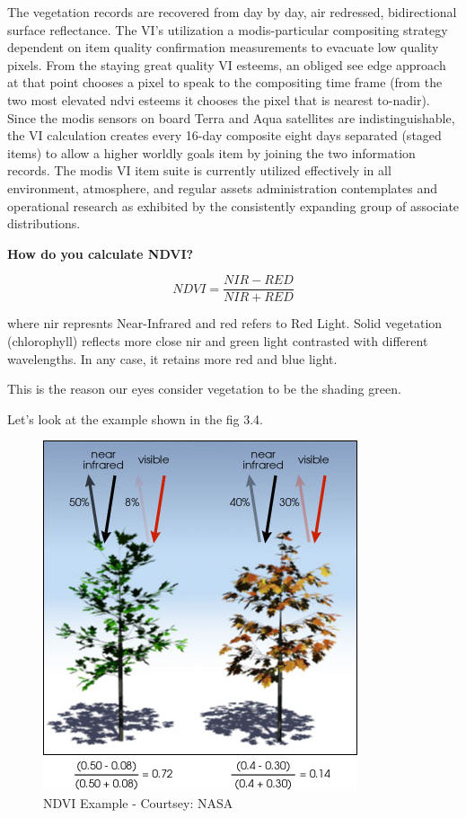 The vegetation records are recovered from day by day, air redressed, bidirectional surface reflectance. The VI's utilization a \gls{modis}-particular compositing strategy dependent on item quality confirmation measurements to evacuate low quality pixels. From the staying great quality VI esteems, an obliged see edge approach at that point chooses a pixel to speak to the compositing time frame (from the two most elevated \gls{ndvi} esteems it chooses the pixel that is nearest to-nadir). Since the \gls{modis} sensors on board Terra and Aqua satellites are indistinguishable, the VI calculation creates every 16-day composite eight days separated (staged items) to allow a higher worldly goals item by joining the two information records. The \gls{modis} VI item suite is currently utilized effectively in all environment, atmosphere, and regular assets administration contemplates and operational research as exhibited by the consistently expanding group of associate distributions. \\

\centerline{\textbf{How do you calculate NDVI?  \cite{theGISGeography}}}

  \begin{equation} \label{eq:ndvi_formula}
       NDVI = \frac{NIR - RED}{NIR + RED}
    \end{equation} 


where \gls{nir} represnts Near-Infrared and \gls{red} refers to Red Light. Solid vegetation (chlorophyll) reflects more close \gls{nir} and green light contrasted with different wavelengths. In any case, it retains more red and blue light. 

This is the reason our eyes consider vegetation to be the shading green.

Let's look at the example shown in the fig 3.4.

    \begin{figure}[H]
            \centering
            \includegraphics[width=0.5\linewidth]{figures/ch3/ndvi-example.png}
            \caption{\label{fig:ndvi_example} NDVI Example - Courtsey: NASA \cite{MODIS}}
    \end{figure}


